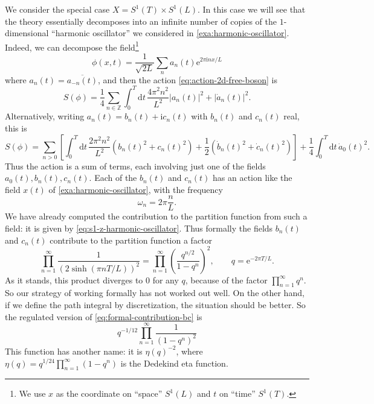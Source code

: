 \documentclass[12pt,letterpaper,reqno]{article}
\numberwithin{equation}{section}
\newcommand{\Z}{\ensuremath{\mathbb Z}}
\newcommand{\half}{\ensuremath{\frac{1}{2}}}
\newcommand{\qtr}{\ensuremath{\frac{1}{4}}}
\newcommand{\I}{{\mathrm i}}
\newcommand{\e}{{\mathrm e}}
\newcommand{\de}{\mathrm{d}}
\newcommand{\abs}[1]{\lvert#1\rvert}
\newcommand{\fixme}[1]{{\color{orange}{[#1]}}}
\begin{document}
We consider the special case $X = S^1(T) \times S^1(L)$.
In this case we will see that the theory essentially decomposes into an infinite
number of copies of the $1$-dimensional ``harmonic oscillator'' we considered in
\autoref{exa:harmonic-oscillator}. Indeed, we can decompose
the field\footnote{We use $x$ as the coordinate on ``space'' $S^1(L)$
and $t$ on ``time'' $S^1(T)$.}
\begin{equation} \label{eq:fourier-expansion-2d}
  \phi(x,t) = \frac{1}{\sqrt{2L}} \sum_n a_n(t) \e^{2 \pi \I n x / L}
\end{equation}
where $a_n(t) = \overline{a_{-n}(t)}$,
and then the action \eqref{eq:action-2d-free-boson} is
\begin{equation}
  S(\phi) = \qtr \sum_{n \in \Z} \int_{0}^T \de t \, \frac{4 \pi^2 n^2}{L^2} \abs{a_n(t)}^2 + \abs{\dot{a}_n(t)}^2.
\end{equation}
Alternatively, writing $a_n(t) = b_n(t) + \I c_n(t)$ with $b_n(t)$ and $c_n(t)$ real, this is
\begin{equation}
  S(\phi) =  \sum_{n > 0} \left[ \int_{0}^T \de t \, \frac{2 \pi^2 n^2}{L^2} (b_n(t)^2 + c_n(t)^2) + \half (\dot{b}_n(t)^2 + \dot{c}_n(t)^2) \right] + \qtr \int_0^T \de t \, \dot a_0(t)^2.
\end{equation}
Thus the action is a sum of terms, each involving just one of the fields 
$a_0(t), b_n(t), c_n(t)$. Each of the $b_n(t)$ and $c_n(t)$ has an action 
like the field $x(t)$ of \autoref{exa:harmonic-oscillator}, with the 
frequency
\begin{equation}
  \omega_n = 2 \pi \frac{n}{L}.
\end{equation}
We have already computed the contribution to the partition function from such a
field: it is given by \eqref{eq:s1-z-harmonic-oscillator}.
Thus formally the fields $b_n(t)$ and $c_n(t)$ contribute to the partition function a factor
\begin{equation} \label{eq:formal-contribution-bc}
  \prod_{n=1}^\infty \frac{1}{(2 \sinh(\pi n T/L))^2} =  \prod_{n=1}^\infty \left( \frac{q^{n/2}}{1 - q^{n}} \right)^2, \qquad q = \e^{-2 \pi T / L}.
\end{equation}
As it stands, this product diverges to $0$ for any $q$, because of the factor
$\prod_{n=1}^\infty q^n$.
So our strategy of working formally
has not worked out well. On the other hand,
if we define the path integral by discretization, the situation should be
better. \fixme{explain regulation of the zero point energy}
So the regulated version of \eqref{eq:formal-contribution-bc} is
\begin{equation}
 q^{-1/12} \prod_{n=1}^\infty \frac{1}{(1-q^n)^2}
\end{equation}
This function has another name: it is $\eta(q)^{-2}$, where
$\eta(q) = q^{1/24} \prod_{n=1}^\infty (1-q^n)$ is the Dedekind eta function.
\end{document}
